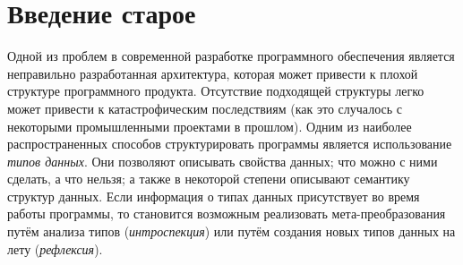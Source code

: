 \section{Введение старое}

\begin{comment}
 Фредерк Брукс (Frederic Brooks) в своей известной книге по инженерии
 программ  "Мифический человеко-месяц" ("The Mythical Man-Month")~\cite{MMM} охарактеризовал сущность программирования следующим образом:
 
 \blockquote{"Программист, подобно поэту, работает почти непосредственно с чистой мыслью. Он строит свои замки в воздухе и из воздуха, творя силой воображения. Трудно найти другой материал, используемый в творчестве, который столь же гибок, прост для шлифовки или переработки и доступен для воплощения грандиозных замыслов. (Как мы позднее увидим, такая податливость таит свои проблемы.)"}
 
 Действительно, нематериальность программ и гибкость их представления  призывает к структурированию; отсутствие подходящей структуры легко может привести к катастрофическим последствиям
 (как это случалось с некоторыми промышленными проектами в прошлом). 
 \end{comment}
 
 Одной из проблем в современной разработке программного обеспечения является неправильно разработанная архитектура, которая может привести к плохой структуре программного продукта. Отсутствие подходящей структуры легко может привести к катастрофическим последствиям
 (как это случалось с некоторыми промышленными проектами в прошлом). 
 Одним из наиболее распространенных способов структурировать программы является использование \emph{типов данных}. Они позволяют описывать свойства данных; что можно с ними сделать, а что нельзя; а также в некоторой степени описывают семантику структур данных. Если информация о типах данных присутствует во время работы программы, то становится возможным реализовать мета-преобразования путём анализа типов (\emph{интроспекция}) или путём создания новых типов данных на лету (\emph{рефлексия}).
 
